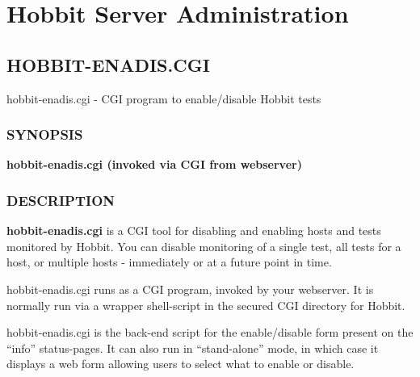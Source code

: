 %
\chapter{Hobbit Server Administration}

%

\newpage
\section{HOBBIT-ENADIS.CGI}
 hobbit-enadis.cgi - CGI program to enable/disable Hobbit tests \
\subsection{SYNOPSIS}
\textbf{hobbit-enadis.cgi (invoked via CGI from webserver)}


 
\subsection{DESCRIPTION}
\textbf{hobbit-enadis.cgi} is a CGI tool for disabling and enabling
hosts and tests monitored by Hobbit. You can disable monitoring of a
single test, all tests for a host, or multiple hosts - immediately or
at a future point in time. 


  hobbit-enadis.cgi runs as a CGI program, invoked by your
  webserver. It is normally run via a wrapper shell-script in the
  secured CGI directory for Hobbit. 



  hobbit-enadis.cgi is the back-end script for the enable/disable form
  present on the ``info'' status-pages. It can also run in
  ``stand-alone'' mode, in which case it displays a web form allowing
  users to select what to enable or disable. 



 


 
